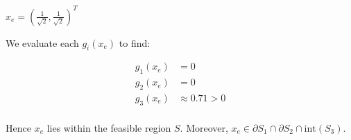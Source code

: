 $ x_e = \left(\frac{1}{\sqrt{2}}, \frac{1}{\sqrt{2}}\right)^T$

\begin{solution}
  We evaluate each $g_i(x_e)$ to find:

  \begin{align*}
    g_1(x_e) &= 0 \\
    g_2(x_e) &= 0 \\
    g_3(x_e) &\approx 0.71 > 0 \\
  \end{align*}

  Hence $x_e$ lies within the feasible region $S$. Moreover, $x_e \in \partial S_1 \cap \partial S_2 \cap \text{int}(S_3) $.
  \ \\
\end{solution}